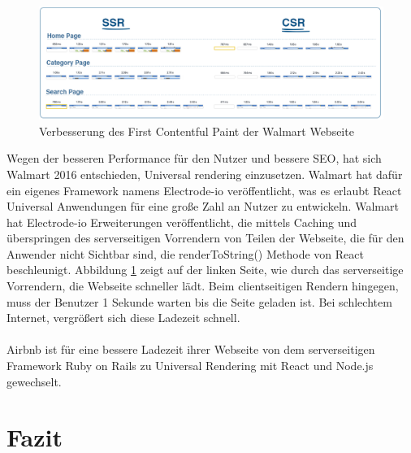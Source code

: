 \documentclass[runningheads]{llncs}
\begin{document}
\begin{figure}
  \centering
  \includegraphics[width=12cm]{images/ssrvscsrwallmart}
  \caption{Verbesserung des First Contentful Paint der Walmart Webseite}
  \label{Verbesserung des First Contentful Paint der Walmart Webseite}
\end{figure}
Wegen der besseren Performance für den Nutzer und bessere SEO, 
hat sich Walmart 2016 entschieden, 
Universal rendering einzusetzen. 
Walmart hat dafür ein eigenes Framework namens Electrode-io veröffentlicht, 
was es erlaubt React Universal Anwendungen für eine große Zahl an Nutzer zu entwickeln. 
Walmart hat Electrode-io Erweiterungen veröffentlicht, 
die mittels Caching und überspringen des serverseitigen Vorrendern von Teilen der Webseite, 
die für den Anwender nicht Sichtbar sind, 
die renderToString() Methode von React beschleunigt. 
Abbildung \ref{Verbesserung des First Contentful Paint der Walmart Webseite} zeigt auf der linken Seite, 
wie durch das serverseitige Vorrendern, 
die Webseite schneller lädt. Beim clientseitigen Rendern hingegen, 
muss der Benutzer 1 Sekunde warten bis die Seite geladen ist. 
Bei schlechtem Internet, vergrößert sich diese Ladezeit schnell.
\\
\\
Airbnb ist für eine bessere Ladezeit ihrer Webseite 
von dem serverseitigen Framework Ruby on Rails zu Universal Rendering mit React und Node.js gewechselt. 

\newpage

\section{Fazit}
\label{sec:Fazit}
\end{document}
